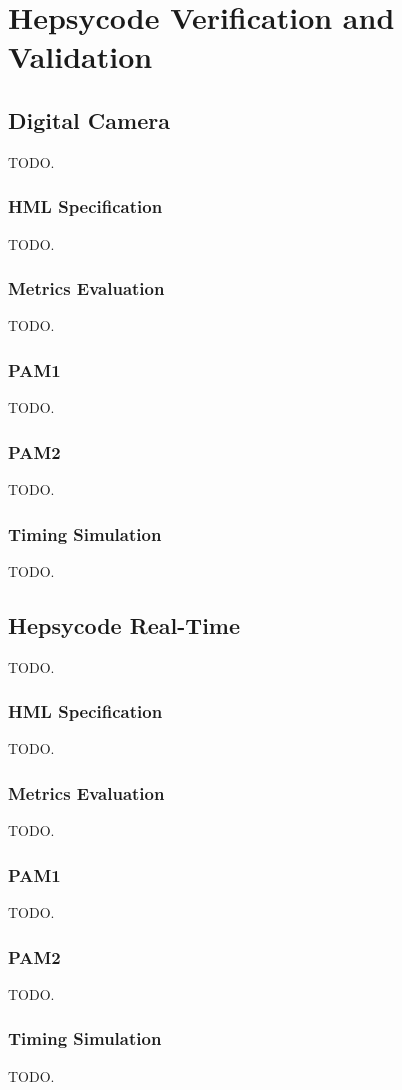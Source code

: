 \chapter{Hepsycode Verification and Validation}  

%
\section{Digital Camera}
%
TODO.
%
\subsection{HML Specification}
%
TODO.
%
\subsection{Metrics Evaluation}
%
TODO.
%
\subsection{PAM1}
%
TODO.
%
\subsection{PAM2}
%
TODO.
%
\subsection{Timing Simulation}
%
TODO.
%
\section{Hepsycode Real-Time}
%
TODO.
%
\subsection{HML Specification}
%
TODO.
%
\subsection{Metrics Evaluation}
%
TODO.
%
\subsection{PAM1}
%
TODO.
%
\subsection{PAM2}
%
TODO.
%
\subsection{Timing Simulation}
%
TODO.
%

